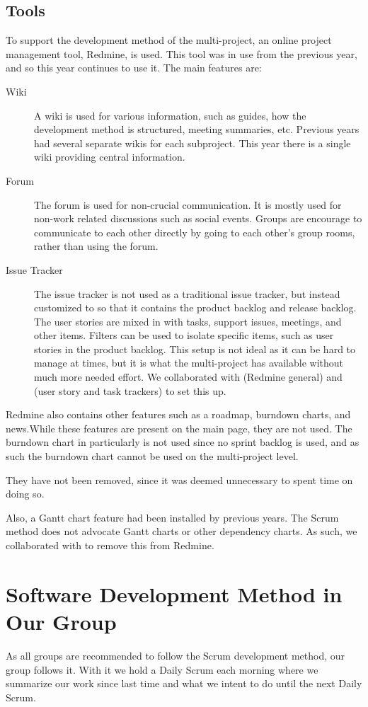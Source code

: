 \subsection{Tools}\label{sec:tools}
To support the development method of the multi-project, an online project management tool, Redmine, is used. This tool was in use from the previous year, and so this year continues to use it. The main features are:  

\begin{description}
  \item[Wiki] A wiki is used for various information, such as guides, how the development method is structured, meeting summaries, etc. Previous years had several separate wikis for each subproject. This year there is a single wiki providing central information.
  \item[Forum] The forum is used for non-crucial communication. It is mostly used for non-work related discussions such as social events. Groups are encourage to communicate to each other directly by going to each other's group rooms, rather than using the forum.
  \item[Issue Tracker] The issue tracker is not used as a traditional issue tracker, but instead customized to so that it contains the product backlog and release backlog. The user stories are mixed in with tasks, support issues, meetings, and other items. Filters can be used to isolate specific items, such as user stories in the product backlog. This setup is not ideal as it can be hard to manage at times, but it is what the multi-project has available without much more needed effort. We collaborated with  (Redmine general) and  (user story and task trackers) to set this up.
\end{description}

Redmine also contains other features such as a roadmap, burndown charts, and news.While these features are present on the main page, they are not used. The burndown chart in particularly is not used since no sprint backlog is used, and as such the burndown chart cannot be used on the multi-project level.

They have not been removed, since it was deemed unnecessary to spent time on doing so.

Also, a Gantt chart feature had been installed by previous years. The Scrum method does not advocate Gantt charts or other dependency charts. As such, we collaborated with  to remove this from Redmine.

\section{Software Development Method in Our Group}\label{sec:swmethod_ourgroup}
As all groups are recommended to follow the Scrum development method, our group follows it. With it we hold a Daily Scrum each morning where we summarize our work since last time and what we intent to do until the next Daily Scrum.

